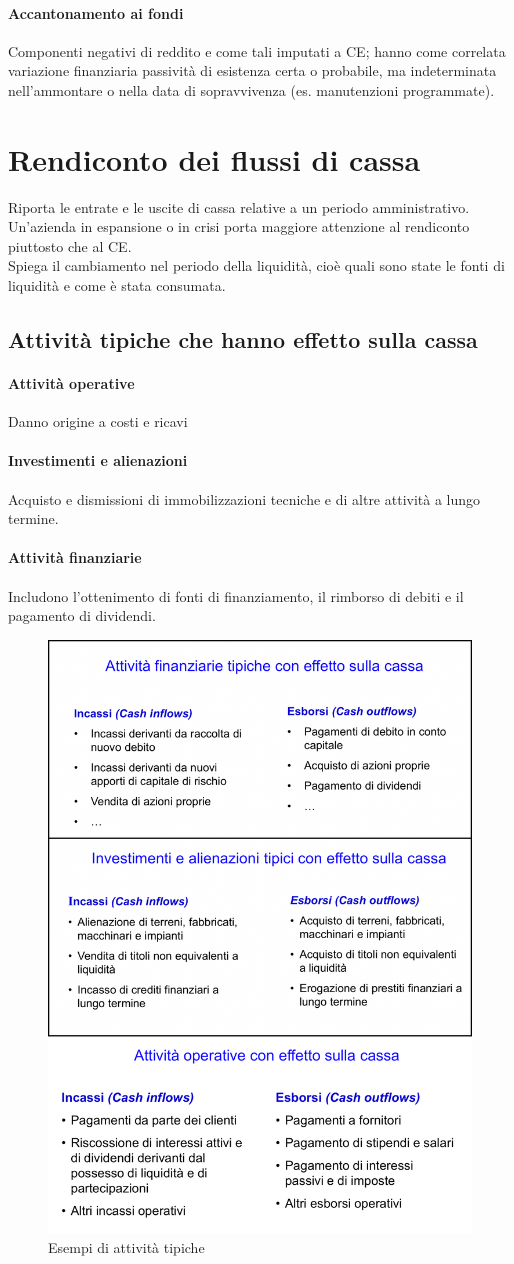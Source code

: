 \documentclass{report}
\begin{document}
	\paragraph{Accantonamento ai fondi} Componenti negativi di reddito e come tali imputati a CE; hanno come correlata variazione finanziaria passività di esistenza certa o probabile, ma indeterminata  nell'ammontare o nella data di sopravvivenza (es. manutenzioni programmate).
	\section{Rendiconto dei flussi di cassa}
	Riporta le entrate e le uscite di cassa relative a un periodo amministrativo. Un'azienda in espansione o in crisi porta maggiore attenzione al rendiconto piuttosto che al CE.
	\medskip \\Spiega il cambiamento nel periodo della liquidità, cioè quali sono state le fonti di liquidità e come è stata consumata.
	\subsection{Attività tipiche che hanno effetto sulla cassa}
	\paragraph{Attività operative} Danno origine a costi e ricavi
	\paragraph{Investimenti e alienazioni} Acquisto e dismissioni di immobilizzazioni tecniche e di altre attività a lungo termine.
	\paragraph{Attività finanziarie} Includono l'ottenimento di fonti di finanziamento, il rimborso di debiti e il pagamento di dividendi.
	\begin{figure}[H]
		\centering
		\includegraphics[width=0.55\linewidth]{images/image-2}
		\caption{Esempi di attività tipiche}
		\label{fig:image-2}
	\end{figure}
\end{document}
